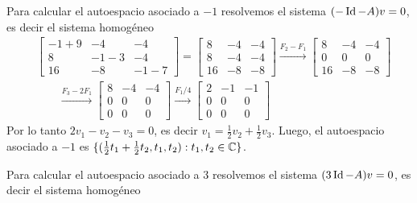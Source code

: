 \begin{enumerate}[resume,topsep=6pt,itemsep=.4cm]
    Para calcular el autoespacio asociado a $-1$ resolvemos el sistema  $(-\operatorname{Id}-A)v=0$, es decir el sistema homogéneo
    \begin{align*}
        &\begin{bmatrix} -1+9 & -4 & -4\\ 8 & -1-3 & -4\\ 16 & -8 & -1-7 \end{bmatrix} =  \begin{bmatrix} 8 & -4 & -4\\ 8 & -4 & -4\\ 16 & -8 & -8 \end{bmatrix} \stackrel{F_2-F_1}{\longrightarrow} \begin{bmatrix} 8 & -4 & -4\\ 0 & 0 & 0\\ 16 & -8 & -8 \end{bmatrix} \\
        &\qquad\stackrel{F_3-2F_1}{\longrightarrow} \begin{bmatrix} 8 & -4 & -4\\ 0 & 0 & 0\\ 0 & 0 & 0 \end{bmatrix} \stackrel{F_1/4}{\longrightarrow} \begin{bmatrix} 2 & -1 & -1\\ 0 & 0 & 0\\ 0 & 0 & 0 \end{bmatrix}
    \end{align*}
    Por lo tanto $2v_1 - v_2 - v_3 =0$, es decir $v_1 = \frac{1}{2} v_2 + \frac{1}{2} v_3$. Luego, el autoespacio asociado a $-1$ es $\{(\frac{1}{2} t_1 + \frac{1}{2} t_2,t_1,t_2): t_1,t_2 \in \mathbb C\}$.

    Para calcular el autoespacio asociado a $3$ resolvemos el sistema  $(3\operatorname{Id}-A)v=0$, es decir el sistema homogéneo


\end{enumerate}
